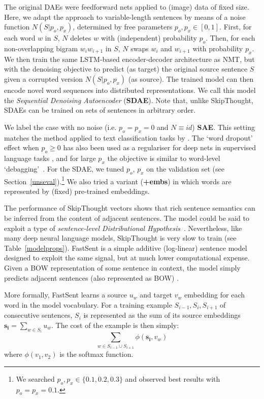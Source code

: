 \documentclass[11pt,letterpaper]{article}
\begin{document}
The original DAEs were feedforward nets applied to (image) data of fixed size. Here, we adapt the approach to variable-length sentences by means of a noise function \(N(S | p_o,p_x)\), determined by free parameters \(p_o,p_x \in [0,1]\). First, for each word \(w\) in \(S\), \(N\) deletes \(w\) with (independent) probability \(p_o\). Then, for each non-overlapping bigram \(w_i w_{i+1}\) in \(S\), \(N\) swaps \(w_i\) and \(w_{i+1}\) with probability \(p_x\). We then train the same LSTM-based encoder-decoder architecture as NMT, but with the denoising objective to predict (as target) the original source sentence \(S\) given a corrupted version \(N(S |p_o,p_x)\) (as source). The trained model can then encode novel word sequences into distributed representations. We call this model the \emph{Sequential Denoising Autoencoder} ({\bf SDAE}). Note that, unlike SkipThought, SDAEs can be trained on sets of sentences in arbitrary order.   

We label the case with no noise (i.e. \(p_o = p_x = 0\) and \(N \equiv id\)) {\bf SAE}. This setting matches the method applied to text classification tasks by . The `word dropout' effect when \(p_o \geq 0\) has also been used as a regulariser for deep nets in supervised language tasks \cite{iyyer2015deep}, and for large \(p_x\) the objective is similar to word-level `debagging'~\cite{sutskever2011generating}. For the SDAE, we tuned \(p_o\), \(p_x\) on the validation set (see Section~\ref{unseval}).\footnote{We searched \(p_o,p_x \in \{0.1,0.2,0.3\}\) and observed best results with \(p_o = p_x = 0.1\).} We also tried a variant ({\bf +embs}) in which words are represented by (fixed) pre-trained embeddings. 

\vspace{5pt} The performance of SkipThought vectors shows that rich sentence semantics can be inferred from the content of adjacent sentences. The model could be said to exploit a type of \emph{sentence-level Distributional Hypothesis}~\cite{harris1954distributional,polajnar2015exploration}. Nevertheless, like many deep neural language models, SkipThought is very slow to train (see Table~\ref{modelprops}). FastSent is a simple additive (log-linear) sentence model designed to exploit the same signal, but at much lower computational expense. Given a BOW representation of some sentence in context, the model simply predicts adjacent sentences (also represented as BOW) .

More formally, FastSent learns a source \(u_w\) and target \(v_w\) embedding for each word in the model vocabulary. For a training example  \(S_{i-1},S_i,S_{i+1}\) of consecutive sentences, \(S_i\) is represented as the sum of its source embeddings \( \mathbf{s_i} = \sum_{w \in S_i} u_w \). The cost of the example is then simply:
\begin{equation} \label{eqn1}
 \sum_{w \in S_{i-1} \cup S_{i+1}} \phi(\mathbf{s_i},v_w) 
 \end{equation}
 where \( \phi(v_1,v_2) \) is the softmax function.  
\end{document}

